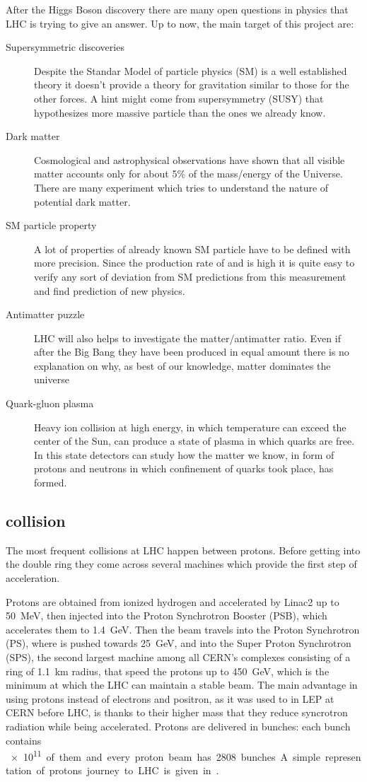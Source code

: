 After the Higgs Boson discovery there are many open questions in physics that LHC is trying to give an answer. Up to now, the main target of this project are:
\begin{description}
\item[Supersymmetric discoveries] Despite the Standar Model of particle physics (SM) is a well established theory it doesn't provide a theory for gravitation similar to those for the other forces. A hint might come from supersymmetry (SUSY) that hypothesizes more massive particle than the ones we already know.
\item[Dark matter] Cosmological and astrophysical observations have shown that all visible matter accounts only for about 5\% of the mass/energy of the Universe. There are many experiment which tries to understand the nature of potential dark matter.
\item[SM particle property] A lot of properties of already known SM particle have to be defined with more precision. Since the production rate of \Wboson and \Zboson is high it is quite easy to verify any sort of deviation from SM predictions from this measurement and find prediction of new physics.
\item[Antimatter puzzle] LHC will also helps to investigate the matter/antimatter ratio. Even if after the Big Bang they have been produced in equal amount there is no explanation on why, as best of our knowledge, matter dominates the universe
\item[Quark-gluon plasma] Heavy ion collision at high energy, in which temperature can exceed the center of the Sun, can produce a state of plasma in which quarks are free. In this state detectors can study how the matter we know, in form of protons and neutrons in which confinement of quarks took place, has formed.
\end{description}

\subsection{\pp collision}
The most frequent collisions at LHC happen between protons. Before getting into the double ring they come across several machines which provide the first step of acceleration.

Protons are obtained from ionized hydrogen and accelerated by Linac2 up to \SI{50}{\MeV}, then injected into the Proton Synchrotron Booster (PSB), which accelerates them to \SI{1.4}{\GeV}. Then the beam travels into the Proton Synchrotron (PS), where is pushed towards \SI{25}{\GeV}, and into the Super Proton Synchrotron (SPS),  the second largest machine among all CERN's complexes consisting of a ring of \SI{1.1}{\km} radius, that speed the protons up to \SI{450}{\GeV}, which is the minimum at which the LHC can maintain a stable beam. The main advantage in using protons instead of electrons and positron, as it was used to in LEP at CERN before LHC, is thanks to their higher mass that they reduce syncrotron radiation while being accelerated. Protons are delivered in bunches: each bunch contains \SI{e11} of them and every proton beam has 2808 bunches. A simple representation of protons journey to LHC is given in \Fig{\ref{fig:accelerators}}.

